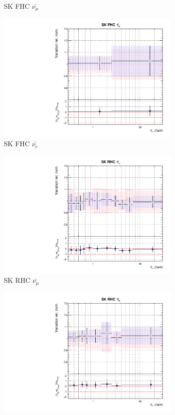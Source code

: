 \begin{figure}[t]
\begin{subfigure}{0.24\textwidth}
  \caption{SK FHC $\bar{\nu_{\mu}}$}
\end{subfigure}
\begin{subfigure}{0.24\textwidth}
  \centering
  \includegraphics[width=0.95\linewidth]{figs/rhcmpdat248flux_11}
  \caption{SK FHC $\bar{\nu_e}$}
\end{subfigure}
\begin{subfigure}{0.24\textwidth}
  \centering
  \includegraphics[width=0.95\linewidth]{figs/rhcmpdat248flux_12}
  \caption{SK RHC $\bar{\nu_{\mu}}$}
\end{subfigure}
\begin{subfigure}{0.24\textwidth}
  \centering
  \includegraphics[width=0.95\linewidth]{figs/rhcmpdat248flux_13}

\end{subfigure}
\end{figure}
